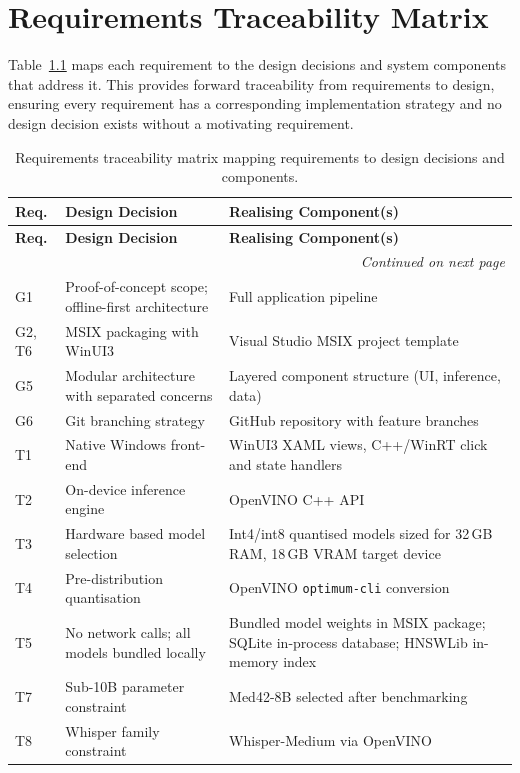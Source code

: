 \chapter{Requirements Traceability Matrix}
\label{app:requirements_traceability}

Table~\ref{tab:rtm} maps each requirement to the design decisions and system components that address it. This provides forward traceability from requirements to design, ensuring every requirement has a corresponding implementation strategy and no design decision exists without a motivating requirement.

\begin{longtable}{l p{5.2cm} p{6.8cm}}
\toprule
\textbf{Req.} & \textbf{Design Decision} & \textbf{Realising Component(s)} \\
\midrule
\endfirsthead
\toprule
\textbf{Req.} & \textbf{Design Decision} & \textbf{Realising Component(s)} \\
\midrule
\endhead
\midrule
\multicolumn{3}{r}{\textit{Continued on next page}} \\
\bottomrule
\endfoot
\bottomrule
\caption{Requirements traceability matrix mapping requirements to design decisions and components.}
\label{tab:rtm}
\endlastfoot
G1 & Proof-of-concept scope; offline-first architecture & Full application pipeline \\
G2, T6 & MSIX packaging with WinUI3 & Visual Studio MSIX project template \\
G5 & Modular architecture with separated concerns & Layered component structure (UI, inference, data) \\
G6 & Git branching strategy & GitHub repository with feature branches \\
\midrule
T1 & Native Windows front-end & WinUI3 XAML views, C++/WinRT click and state handlers \\
T2 & On-device inference engine & OpenVINO C++ API \\
T3 & Hardware based model selection & Int4/int8 quantised models sized for 32\,GB RAM, 18\,GB VRAM target device \\
T4 & Pre-distribution quantisation & OpenVINO \texttt{optimum-cli} conversion \\
T5 & No network calls; all models bundled locally & Bundled model weights in MSIX package; SQLite in-process database; HNSWLib in-memory index \\
T7 & Sub-10B parameter constraint & Med42-8B selected after benchmarking \\
T8 & Whisper family constraint & Whisper-Medium via OpenVINO \\

\end{longtable}
